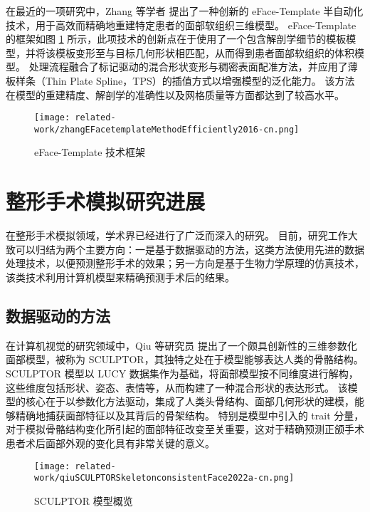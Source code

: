 在最近的一项研究中，Zhang 等学者 \cite{zhangEFacetemplateMethodEfficiently2016} 提出了一种创新的 eFace-Template 半自动化技术，用于高效而精确地重建特定患者的面部软组织三维模型。
eFace-Template 的框架如图 \ref{fig:zhangEFacetemplateMethodEfficiently2016} 所示，此项技术的创新点在于使用了一个包含解剖学细节的模板模型，并将该模板变形至与目标几何形状相匹配，从而得到患者面部软组织的体积模型。
处理流程融合了标记驱动的混合形状变形与稠密表面配准方法，并应用了薄板样条（Thin Plate Spline，TPS）的插值方式以增强模型的泛化能力。
该方法在模型的重建精度、解剖学的准确性以及网格质量等方面都达到了较高水平。

\begin{figure}
  \centering
  \texttt{[image: related-work/zhangEFacetemplateMethodEfficiently2016-cn.png]}
  \caption{eFace-Template 技术框架 \cite{zhangEFacetemplateMethodEfficiently2016}}
  \label{fig:zhangEFacetemplateMethodEfficiently2016}
\end{figure}

\section{整形手术模拟研究进展}

在整形手术模拟领域，学术界已经进行了广泛而深入的研究。
目前，研究工作大致可以归结为两个主要方向：一是基于数据驱动的方法，这类方法使用先进的数据处理技术，以便预测整形手术的效果；另一方向是基于生物力学原理的仿真技术，该类技术利用计算机模型来精确预测手术后的结果。

\subsection{数据驱动的方法}

在计算机视觉的研究领域中，Qiu 等研究员 \cite{qiuSCULPTORSkeletonconsistentFace2022a} 提出了一个颇具创新性的三维参数化面部模型，被称为 SCULPTOR，其独特之处在于模型能够表达人类的骨骼结构。SCULPTOR 模型以 LUCY 数据集作为基础，将面部模型按不同维度进行解构，这些维度包括形状、姿态、表情等，从而构建了一种混合形状的表达形式。
该模型的核心在于以参数化方法驱动，集成了人类头骨结构、面部几何形状的建模，能够精确地捕获面部特征以及其背后的骨架结构。
特别是模型中引入的 trait 分量，对于模拟骨骼结构变化所引起的面部特征改变至关重要，这对于精确预测正颌手术患者术后面部外观的变化具有非常关键的意义。

\begin{figure}
  \centering
  \texttt{[image: related-work/qiuSCULPTORSkeletonconsistentFace2022a-cn.png]}
  \caption{SCULPTOR 模型概览 \cite{qiuSCULPTORSkeletonconsistentFace2022a}}
  \label{fig:qiuSCULPTORSkeletonconsistentFace2022a}
\end{figure}

